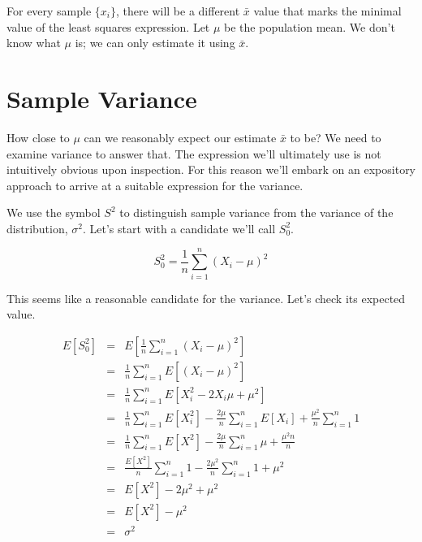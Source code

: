 \documentclass[]{article}
\begin{document}
For every sample $\{x_i\}$, there will be a different $\bar{x}$
value that marks the minimal value of the least squares expression.
Let $\mu$ be the population mean.  We don't know what $\mu$ is; we
can only estimate it using $\bar{x}$.

\section{Sample Variance}

How close to $\mu$ can we reasonably expect our estimate $\bar{x}$ to be?
We need to examine variance to answer that.  The expression we'll ultimately
use is not intuitively obvious upon inspection.  For this reason we'll
embark on an expository approach to arrive at a suitable expression
for the variance.

We use the symbol $S^2$ to distinguish sample variance from the
variance of the distribution, $\sigma^2$.  Let's start with a
candidate we'll call $S_0^2$.

\begin{equation} \label{s0}
S_0^2 = \frac{1}{n} \sum_{i=1}^n (X_i - \mu)^2
\end{equation}

This seems like a reasonable candidate for the variance.  Let's
check its expected value.

\begin{eqnarray}
E\left[ S_0^2 \right] &= &E \left[ \frac{1}{n} \sum_{i=1}^n 
         (X_i - \mu)^2\right] \nonumber \\
  &= &\frac{1}{n} \sum_{i=1}^n E \left[ (X_i - \mu)^2 \right] \nonumber \\
  &= &\frac{1}{n} \sum_{i=1}^n E \left[ X_i^2 - 2 X_i \mu + \mu^2 \right] \nonumber \\ 
  &= &\frac{1}{n} \sum_{i=1}^n E \left[ X_i^2 \right] -
      \frac{2 \mu}{n} \sum_{i=1}^n E [ X_i ] + 
      \frac{\mu^2}{n} \sum_{i=1}^n 1 \nonumber \\
  &= &\frac{1}{n} \sum_{i=1}^n E \left[ X^2 \right] -
      \frac{2 \mu}{n} \sum_{i=1}^n \mu + 
      \frac{\mu^2 n}{n}  \label{s01}   \\
  &= &\frac{E \left[ X^2 \right] }{n} \sum_{i=1}^n 1 - 
      \frac{2 \mu^2}{n} \sum_{i=1}^n 1 + \mu^2  \nonumber \\
  &= &E \left[ X^2 \right] -  2 \mu^2 + \mu^2  \nonumber \\
  &= &E \left[ X^2 \right] -  \mu^2  \nonumber  \\
  &= &\sigma^2  \nonumber
\end{eqnarray}
\end{document}

